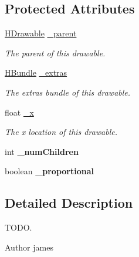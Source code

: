 \subsection*{Protected Attributes}
\begin{DoxyCompactItemize}
\item 
\hyperlink{classhype_1_1drawable_1_1_h_drawable}{H\-Drawable} \hyperlink{classhype_1_1drawable_1_1_h_drawable_a1f95d00444c6964efa4239ddf135a10e}{\-\_\-parent}
\begin{DoxyCompactList}\small\item\em The parent of this drawable. \end{DoxyCompactList}\item 
\hyperlink{classhype_1_1util_1_1_h_bundle}{H\-Bundle} \hyperlink{classhype_1_1drawable_1_1_h_drawable_a77a64d01b7766ad4d0e338f82ab23f12}{\-\_\-extras}
\begin{DoxyCompactList}\small\item\em The extras bundle of this drawable. \end{DoxyCompactList}\item 
float \hyperlink{classhype_1_1drawable_1_1_h_drawable_a20c0ae16de46b74c903667ac2db1640a}{\-\_\-x}
\begin{DoxyCompactList}\small\item\em The x location of this drawable. \end{DoxyCompactList}\item 
\hypertarget{classhype_1_1drawable_1_1_h_drawable_a1e2205f639598af5f419b82ae5bdc0cf}{int {\bfseries \-\_\-num\-Children}}\label{classhype_1_1drawable_1_1_h_drawable_a1e2205f639598af5f419b82ae5bdc0cf}

\item 
\hypertarget{classhype_1_1drawable_1_1_h_drawable_a7f9bb1ed841a8c8fe52e351ee3bf5844}{boolean {\bfseries \-\_\-proportional}}\label{classhype_1_1drawable_1_1_h_drawable_a7f9bb1ed841a8c8fe52e351ee3bf5844}

\end{DoxyCompactItemize}


\subsection{Detailed Description}
T\-O\-D\-O. 

\begin{DoxyAuthor}{Author}
james 
\end{DoxyAuthor}


